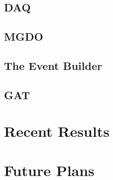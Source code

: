 \documentclass[/main.tex]{subfiles}
\begin{document}
\subsection{DAQ}
\subsection{MGDO}
\subsection{The Event Builder}
\subsection{GAT}

\section{Recent Results}

\section{Future Plans}

\onlyinsubfile{
  
  
}
\end{document}
